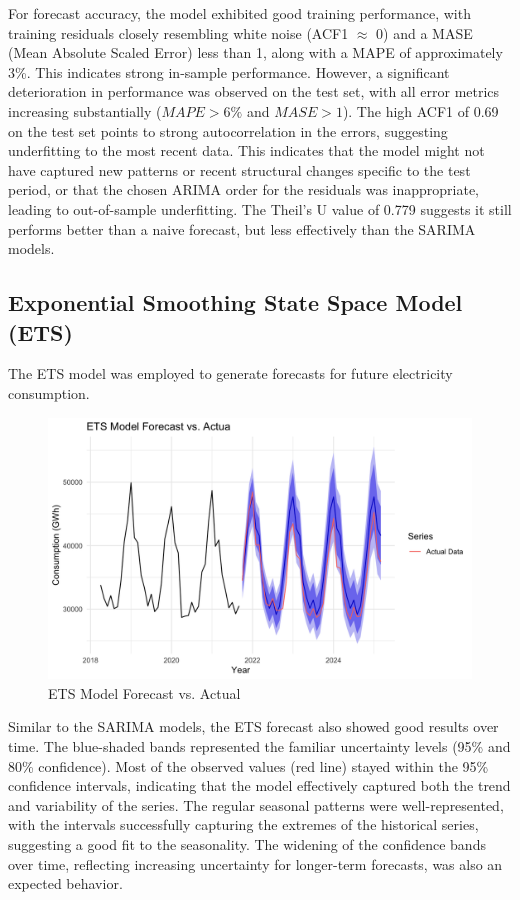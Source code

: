 For forecast accuracy, the model exhibited good training performance, with training residuals closely resembling white noise (ACF1 $\approx$ 0) and a MASE (Mean Absolute Scaled Error) less than 1, along with a MAPE of approximately 3\%. This indicates strong in-sample performance. However, a significant deterioration in performance was observed on the test set, with all error metrics increasing substantially ($MAPE > 6\% $ and  $MASE > 1$). The high ACF1 of 0.69 on the test set points to strong autocorrelation in the errors, suggesting underfitting to the most recent data. This indicates that the model might not have captured new patterns or recent structural changes specific to the test period, or that the chosen ARIMA order for the residuals was inappropriate, leading to out-of-sample underfitting. The Theil's U value of 0.779 suggests it still performs better than a naive forecast, but less effectively than the SARIMA models.\\

\subsection{Exponential Smoothing State Space Model (ETS)}

The ETS model was employed to generate forecasts for future electricity consumption.\\

\begin{figure}[H]
    \centering
    \includegraphics[width=1\linewidth]{images/for_ets.png}
    \caption{ETS Model Forecast vs. Actual}
    \label{fig:enter-label}
\end{figure}

Similar to the SARIMA models, the ETS forecast also showed good results over time. The blue-shaded bands represented the familiar uncertainty levels (95\% and 80\% confidence). Most of the observed values (red line) stayed within the 95\% confidence intervals, indicating that the model effectively captured both the trend and variability of the series. The regular seasonal patterns were well-represented, with the intervals successfully capturing the extremes of the historical series, suggesting a good fit to the seasonality. The widening of the confidence bands over time, reflecting increasing uncertainty for longer-term forecasts, was also an expected behavior.\\


